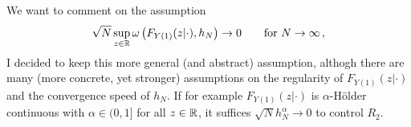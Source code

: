         \begin{remark}
We want to comment on the assumption
\begin{gather*}
  \sqrt{N}
  \sup_{z\in\R}
  \omega
  \left( 
    F_{Y(1)}(z|\cdot)
    ,h_N
  \right)
  \to
  0
  \qquad
  \text{for}\ 
  N\to \infty
  \,,
\end{gather*}
I decided to keep this more general (and abstract) assumption, althogh
there are many (more concrete, yet stronger) assumptions on the regularity of
$
    F_{Y(1)}(z|\cdot)
$
and the convergence speed of $h_N$.
If for example 
$
    F_{Y(1)}(z|\cdot)
$
is $\alpha$-Hölder continuous with $\alpha\in(0,1]$ for all $z\in\mathbb{R}$, it suffices $\sqrt{N}h_N^\alpha\to0$ to control $R_2$.

        \end{remark}
